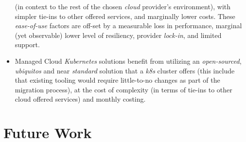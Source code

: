 \begin{itemize}
        (in context to the rest of the chosen \textit{cloud} provider's environment), with simpler tie-ins to other offered services, and marginally lower costs.
        These \emph{ease-of-use} factors are off-set by a measurable loss in performance, marginal (yet observable) lower level of resiliency, provider \textit{lock-in},
        and limited support.
  \item Managed Cloud \textit{Kubernetes} solutions benefit from utilizing an \textit{open-sourced}, \emph{ubiquitos} and near \textit{standard} solution
        that a \textit{k8s} cluster offers (this include that existing tooling would require little-to-no changes as part of the migration process),
        at the cost of complexity (in terms of tie-ins to other cloud offered services) and monthly costing.
\end{itemize}

\chapter{Future Work}
